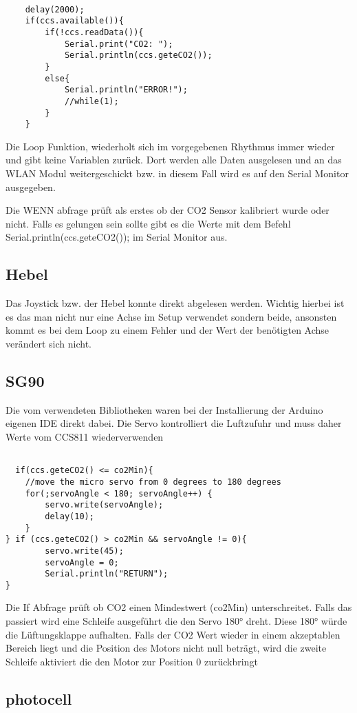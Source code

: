	\begin{lstlisting}
	
	delay(2000);
	if(ccs.available()){
		if(!ccs.readData()){
			Serial.print("CO2: ");
			Serial.println(ccs.geteCO2());
		}
		else{
			Serial.println("ERROR!");
			//while(1);
		}
	}
	\end{lstlisting}
	\cite{CCS811man}



Die Loop Funktion, wiederholt sich im vorgegebenen Rhythmus immer wieder und gibt keine Variablen zurück. Dort werden alle Daten ausgelesen und an das WLAN Modul weitergeschickt bzw. in diesem Fall wird es auf den Serial Monitor ausgegeben.

Die WENN abfrage prüft als erstes ob der CO2 Sensor kalibriert wurde oder nicht. Falls es gelungen sein sollte gibt es die Werte mit dem Befehl Serial.println(ccs.geteCO2()); im Serial Monitor aus.

\subsection{Hebel}

Das Joystick bzw. der Hebel konnte direkt abgelesen werden. Wichtig hierbei ist es das man nicht nur eine Achse im Setup verwendet sondern beide, ansonsten kommt es bei dem Loop zu einem Fehler und der Wert der benötigten Achse verändert sich nicht.


\subsection{SG90}

Die vom verwendeten Bibliotheken waren bei der Installierung der Arduino eigenen IDE direkt dabei. Die Servo kontrolliert die Luftzufuhr und muss daher Werte vom CCS811 wiederverwenden

\begin{lstlisting}

  if(ccs.geteCO2() <= co2Min){
	//move the micro servo from 0 degrees to 180 degrees
	for(;servoAngle < 180; servoAngle++) {       
		servo.write(servoAngle);              
		delay(10);
	} 
} if (ccs.geteCO2() > co2Min && servoAngle != 0){
		servo.write(45); 
		servoAngle = 0;
		Serial.println("RETURN");
}
\end{lstlisting}
\cite{SG90tut}

Die If Abfrage prüft ob CO2 einen Mindestwert (co2Min) unterschreitet. Falls das passiert  wird eine Schleife ausgeführt die den Servo 180° dreht. Diese 180° würde die Lüftungsklappe aufhalten. Falls der CO2 Wert wieder in einem akzeptablen Bereich liegt und die Position des Motors nicht null beträgt, wird die zweite Schleife aktiviert die den Motor zur Position 0 zurückbringt 


\subsection{photocell}



